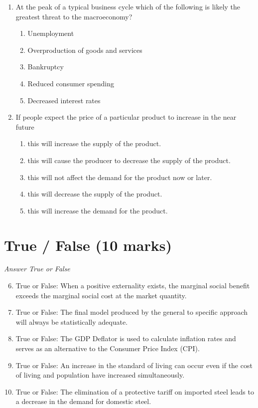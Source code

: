 \documentclass[12pt]{article}
\begin{document}
\begin{enumerate}[label=\arabic*.]
\begin{enumerate}[label=(\alph*)]
\end{enumerate}
\item At the peak of a typical business cycle which of the following is likely the greatest threat to the macroeconomy?
\begin{enumerate}[label=(\alph*)]
    \item Unemployment
    \item Overproduction of goods and services
    \item Bankruptcy
    \item Reduced consumer spending
    \item Decreased interest rates
\end{enumerate}
\item If people expect the price of a particular product to increase in the near future
\begin{enumerate}[label=(\alph*)]
    \item this will increase the supply of the product.
    \item this will cause the producer to decrease the supply of the product.
    \item this will not affect the demand for the product now or later.
    \item this will decrease the supply of the product.
    \item this will increase the demand for the product.
\end{enumerate}
\end{enumerate}

\section*{True / False (10 marks)}
\textit{Answer True or False}
\begin{enumerate}[label=\arabic*.]
\setcounter{enumi}{5}
\item True or False: When a positive externality exists, the marginal social benefit exceeds the marginal social cost at the market quantity.
\item True or False: The final model produced by the general to specific approach will always be statistically adequate.
\item True or False: The GDP Deflator is used to calculate inflation rates and serves as an alternative to the Consumer Price Index (CPI).
\item True or False: An increase in the standard of living can occur even if the cost of living and population have increased simultaneously.
\item True or False: The elimination of a protective tariff on imported steel leads to a decrease in the demand for domestic steel.
\end{enumerate}
\end{document}
